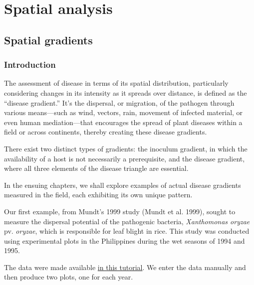 \documentclass[
  letterpaper,
]{book}
\begin{document}
\part{Spatial analysis}

\hypertarget{spatial-gradients}{%
\chapter{Spatial gradients}\label{spatial-gradients}}

\hypertarget{introduction-2}{%
\section{Introduction}\label{introduction-2}}

The assessment of disease in terms of its spatial distribution,
particularly considering changes in its intensity as it spreads over
distance, is defined as the ``disease gradient.'' It's the dispersal, or
migration, of the pathogen through various means---such as wind,
vectors, rain, movement of infected material, or even human
mediation---that encourages the spread of plant diseases within a field
or across continents, thereby creating these disease gradients.

There exist two distinct types of gradients: the inoculum gradient, in
which the availability of a host is not necessarily a prerequisite, and
the disease gradient, where all three elements of the disease triangle
are essential.

In the ensuing chapters, we shall explore examples of actual disease
gradients measured in the field, each exhibiting its own unique pattern.

Our first example, from Mundt's 1999 study (Mundt et al. 1999), sought
to measure the dispersal potential of the pathogenic bacteria,
\emph{Xanthomonas oryzae} pv. \emph{oryzae}, which is responsible for
leaf blight in rice. This study was conducted using experimental plots
in the Philippines during the wet seasons of 1994 and 1995.

The data were made available
\href{https://www.apsnet.org/edcenter/disimpactmngmnt/topc/EcologyAndEpidemiologyInR/ModelingDispersalGradients/Pages/PrimaryDiseaseGradientsofBacteria.aspx}{in
this tutorial}. We enter the data manually and then produce two plots,
one for each year.
\end{document}

